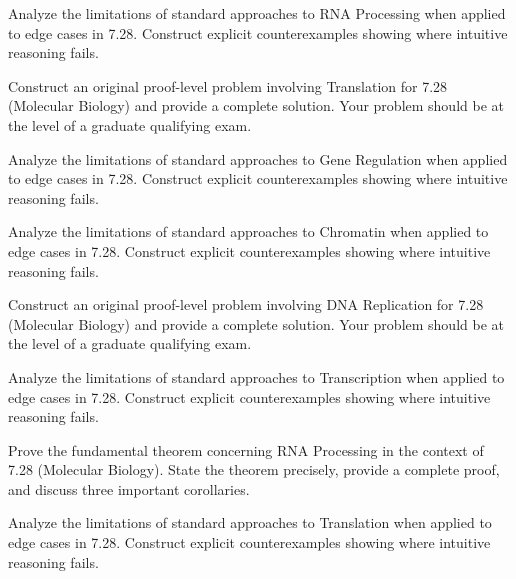 \documentclass[12pt,a4paper]{exam}
\begin{document}
\begin{questions}
\vspace{0.3cm}

\question[5]
Analyze the limitations of standard approaches to RNA Processing when applied to edge cases in 7.28. Construct explicit counterexamples showing where intuitive reasoning fails.

\vspace{0.3cm}

\question[5]
Construct an original proof-level problem involving Translation for 7.28 (Molecular Biology) and provide a complete solution. Your problem should be at the level of a graduate qualifying exam.

\vspace{0.3cm}

\question[4]
Analyze the limitations of standard approaches to Gene Regulation when applied to edge cases in 7.28. Construct explicit counterexamples showing where intuitive reasoning fails.

\vspace{0.3cm}

\question[3]
Analyze the limitations of standard approaches to Chromatin when applied to edge cases in 7.28. Construct explicit counterexamples showing where intuitive reasoning fails.

\vspace{0.3cm}

\question[4]
Construct an original proof-level problem involving DNA Replication for 7.28 (Molecular Biology) and provide a complete solution. Your problem should be at the level of a graduate qualifying exam.

\vspace{0.3cm}

\question[7]
Analyze the limitations of standard approaches to Transcription when applied to edge cases in 7.28. Construct explicit counterexamples showing where intuitive reasoning fails.

\vspace{0.3cm}

\question[3]
Prove the fundamental theorem concerning RNA Processing in the context of 7.28 (Molecular Biology). State the theorem precisely, provide a complete proof, and discuss three important corollaries.

\vspace{0.3cm}

\question[5]
Analyze the limitations of standard approaches to Translation when applied to edge cases in 7.28. Construct explicit counterexamples showing where intuitive reasoning fails.


\end{questions}
\end{document}
